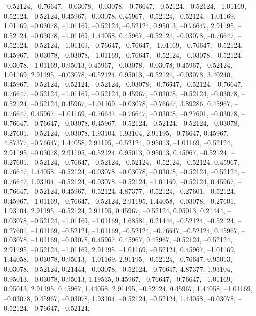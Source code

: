\documentclass{article}
\begin{document}
{--0.52124, --0.76647, --0.03078, --0.03078, --0.76647, --0.52124,
--0.52124, --1.01169, --0.52124, --0.52124, 0.45967, --0.03078, 0.45967,
--0.52124, --0.52124, --1.01169, --1.01169, --0.03078, --1.01169,
--0.52124, --0.52124, 0.95013, --0.76647, 2.91195, --0.52124, --0.03078,
--1.01169, 1.44058, 0.45967, --0.52124, --0.03078, --0.76647, --0.52124,
--0.52124, --1.01169, --0.76647, --0.76647, --1.01169, --0.76647,
--0.52124, 0.45967, --0.03078, --0.03078, --1.01169, --0.76647,
--0.52124, --0.03078, --0.52124, --0.03078, --1.01169, 0.95013, 0.45967,
--0.03078, --0.03078, 0.45967, --0.52124, --1.01169, 2.91195, --0.03078,
--0.52124, 0.95013, --0.52124, --0.03078, 3.40240, 0.45967, --0.52124,
--0.52124, --0.52124, --0.03078, --0.76647, --0.52124, --0.76647,
--0.76647, --0.52124, --1.01169, --0.52124, 0.45967, --0.03078,
--0.52124, --0.03078, --0.52124, --0.52124, 0.45967, --1.01169,
--0.03078, --0.76647, 3.89286, 0.45967, --0.76647, 0.45967, --1.01169,
--0.76647, --0.76647, --0.03078, --0.27601, --0.03078, --0.76647,
--0.76647, --0.03078, 0.45967, --0.52124, --0.52124, --0.52124,
--0.03078, --0.27601, --0.52124, --0.03078, 1.93104, 1.93104, 2.91195,
--0.76647, 0.45967, 4.87377, --0.76647, 1.44058, 2.91195, --0.52124,
0.95013, --1.01169, --0.52124, 2.91195, --0.03078, 2.91195, --0.52124,
0.95013, 0.95013, 0.45967, --0.52124, --0.27601, --0.52124, --0.76647,
--0.52124, --0.52124, --0.52124, --0.52124, 0.45967, --0.76647, 1.44058,
--0.52124, --0.03078, --0.03078, --0.03078, --0.52124, --0.52124,
--0.76647, 1.93104, --0.52124, --0.03078, --0.52124, --1.01169,
--0.52124, 0.45967, --0.76647, --0.52124, 0.45967, --0.52124, 4.87377,
--0.52124, --0.27601, --0.52124, 0.45967, --1.01169, --0.76647,
--0.52124, 2.91195, 1.44058, --0.03078, --0.27601, 1.93104, 2.91195,
--0.52124, 2.91195, 0.45967, --0.52124, 0.95013, 0.21444, --0.03078,
--0.52124, --1.01169, --1.01169, 1.68581, 0.21444, --0.52124, --0.52124,
--0.27601, --1.01169, --0.52124, --1.01169, --0.52124, --0.76647,
--0.52124, 0.45967, --0.03078, --1.01169, --0.03078, 0.45967, 0.45967,
0.45967, --0.52124, --0.52124, 2.91195, --0.52124, --1.01169, 2.91195,
--1.01169, --0.52124, 0.45967, --1.01169, 1.44058, --0.03078, 0.95013,
--1.01169, 2.91195, --0.52124, --0.76647, 0.95013, --0.03078, --0.52124,
0.21444, --0.03078, --0.52124, --0.76647, 4.87377, 1.93104, 0.95013,
--0.03078, 0.95013, 1.19535, 0.45967, --0.76647, --0.76647, --1.01169,
0.95013, 2.91195, 0.45967, 1.44058, 2.91195, --0.52124, 0.45967,
1.44058, --1.01169, --0.03078, 0.45967, --0.03078, 1.93104, --0.52124,
--0.52124, 1.44058, --0.03078, --0.52124, --0.76647, --0.52124,
}
\end{document}
